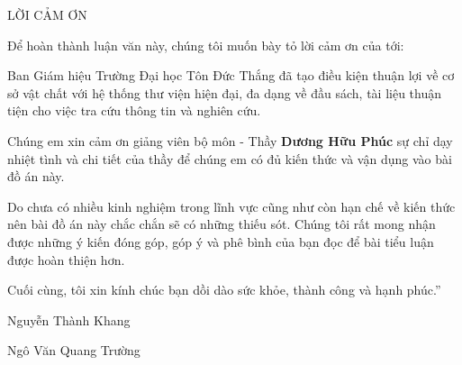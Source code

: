 \begin{center}
    \textsc{\huge LỜI CẢM ƠN}\\[1cm]
\end{center}

\textmd{\large Để hoàn thành luận văn này, chúng tôi muốn
bày tỏ lời cảm ơn của tới:}

\textmd{\large Ban Giám hiệu Trường Đại học Tôn Đức Thắng đã tạo điều kiện thuận lợi về cơ sở vật chất với hệ thống thư viện hiện đại, đa dạng về đầu sách, tài liệu thuận tiện cho việc tra cứu thông tin và nghiên cứu.}

\textmd{\large \tab Chúng em xin cảm ơn giảng viên bộ môn - Thầy \textbf{\large Dương Hữu Phúc}  sự chỉ dạy nhiệt tình và chi tiết của thầy để chúng em có đủ kiến thức và vận dụng vào bài đồ án này.}


\textmd{\large Do chưa có nhiều kinh nghiệm trong lĩnh vực cũng như còn hạn chế về kiến thức nên bài đồ án này chắc chắn sẽ có những thiếu sót. Chúng tôi rất mong nhận được những ý kiến đóng góp, góp ý và phê bình của bạn đọc để bài tiểu luận được hoàn thiện hơn.}

\textmd{\large Cuối cùng, tôi xin kính chúc bạn dồi dào sức khỏe, thành công và hạnh phúc.”}
\newline
\begin{flushright} \large
\textmd{\large Nguyễn Thành Khang}
\end{flushright}
\begin{flushright} \large
\textmd{\large Ngô Văn Quang Trường}
\end{flushright}
\vspace{25cm}








